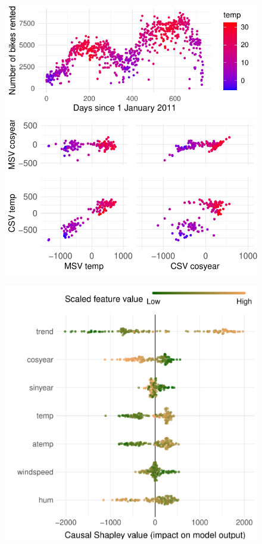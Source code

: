 \documentclass{article}
\begin{document}
\begin{figure}[t]
	\centering
	\begin{minipage}{.49\linewidth}
		\includegraphics[width=\textwidth]{figures/trend_plot.pdf}
		\includegraphics[width=\textwidth]{figures/corr_plots_top.pdf}
		\includegraphics[width=\textwidth]{figures/corr_plots_bottom.pdf}
	\end{minipage}
	\begin{minipage}{.5\linewidth}
		\vfill
		\includegraphics[width=\textwidth]{figures/sina_plot.pdf}

\end{minipage}
\end{figure}
\end{document}
